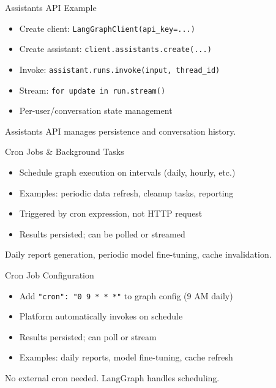 \documentclass[aspectratio=169,11pt]{beamer}
\begin{document}
\begin{frame}{Assistants API Example}
\setlength{\itemsep}{1pt}
\begin{itemize}
\item Create client: \texttt{LangGraphClient(api\_key=...)}
\item Create assistant: \texttt{client.assistants.create(...)}
\item Invoke: \texttt{assistant.runs.invoke(input, thread\_id)}
\item Stream: \texttt{for update in run.stream()}
\item Per-user/conversation state management
\end{itemize}
\vspace{0.1cm}
\begin{tipbox}
Assistants API manages persistence and conversation history.
\end{tipbox}
\end{frame}

\begin{frame}{Cron Jobs \& Background Tasks}
\setlength{\itemsep}{1pt}
\begin{itemize}
\item Schedule graph execution on intervals (daily, hourly, etc.)
\item Examples: periodic data refresh, cleanup tasks, reporting
\item Triggered by cron expression, not HTTP request
\item Results persisted; can be polled or streamed
\end{itemize}
\vspace{0.15cm}
\begin{tipbox}
Daily report generation, periodic model fine-tuning, cache invalidation.
\end{tipbox}
\end{frame}

\begin{frame}{Cron Job Configuration}
\setlength{\itemsep}{1pt}
\begin{itemize}
\item Add \texttt{"cron": "0 9 * * *"} to graph config (9 AM daily)
\item Platform automatically invokes on schedule
\item Results persisted; can poll or stream
\item Examples: daily reports, model fine-tuning, cache refresh
\end{itemize}
\vspace{0.1cm}
\begin{tipbox}
No external cron needed. LangGraph handles scheduling.
\end{tipbox}
\end{frame}
\end{document}
